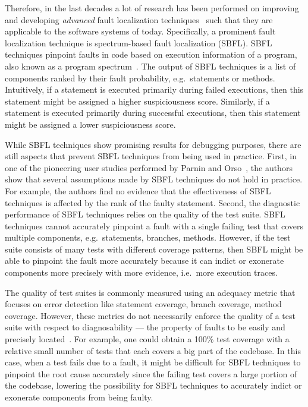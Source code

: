 \documentclass[twoside,a4paper,11pt]{memoir}
\begin{document}
Therefore, in the last decades a lot of research has been performed on improving and developing \emph{advanced} fault localization techniques~\cite{wong2016survey} such that they are applicable to the software systems of today.
Specifically, a prominent fault localization technique is spectrum-based fault localization (SBFL).
SBFL techniques pinpoint faults in code based on execution information of a program, also known as a program spectrum~\cite{reps1997use}.
The output of SBFL techniques is a list of components ranked by their fault probability, e.g.\ statements or methods.
Intuitively, if a statement is executed primarily during failed executions, then this statement might be assigned a higher suspiciousness score.
Similarly, if a statement is executed primarily during successful executions, then this statement might be assigned a lower suspiciousness score.

While SBFL techniques show promising results for debugging purposes, there are still aspects that prevent SBFL techniques from being used in practice.
First, in one of the pioneering user studies performed by Parnin and Orso~\cite{Parnin:2011:ADT:2001420.2001445}, the authors show that several assumptions made by SBFL techniques do not hold in practice.
For example, the authors find no evidence that the effectiveness of SBFL techniques is affected by the rank of the faulty statement.
Second, the diagnostic performance of SBFL techniques relies on the quality of the test suite.
SBFL techniques cannot accurately pinpoint a fault with a single failing test that covers multiple components, e.g.\ statements, branches, methods.
However, if the test suite consists of many tests with different coverage patterns, then SBFL might be able to pinpoint the fault more accurately because it can indict or exonerate components more precisely with more evidence, i.e.\ more execution traces.

The quality of test suites is commonly measured using an adequacy metric that focuses on error detection like statement coverage, branch coverage, method coverage.
However, these metrics do not necessarily enforce the quality of a test suite with respect to diagnosability --- the property of faults to be easily and precisely located~\cite{730889}.
For example, one could obtain a 100\% test coverage with a relative small number of tests that each covers a big part of the codebase.
In this case, when a test fails due to a fault, it might be difficult for SBFL techniques to pinpoint the root cause accurately since the failing test covers a large portion of the codebase, lowering the possibility for SBFL techniques to accurately indict or exonerate components from being faulty.
\end{document}
